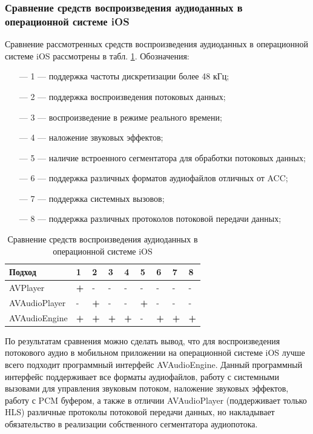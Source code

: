 	\subsubsection{Сравнение средств воспроизведения аудиоданных в операционной системе iOS}
		\par Сравнение рассмотренных средств воспроизведения аудиоданных в операционной системе iOS рассмотрены в табл. \ref{tab:ios}. 
		Обозначения:
		\begin{itemize}
			\item[---] 1 --- поддержка частоты дискретизации более 48 кГц;
			\item[---] 2 --- поддержка воспроизведения потоковых данных;
			\item[---] 3 --- воспроизведение в режиме реального времени;
			\item[---] 4 --- наложение звуковых эффектов;
			\item[---] 5 --- наличие встроенного сегментатора для обработки потоковых данных;
			\item[---] 6 --- поддержка различных форматов аудиофайлов отличных от ACC;
			\item[---] 7 --- поддержка системных вызовов;  
			\item[---] 8 --- поддержка различных протоколов потоковой передачи данных;  
		\end{itemize}

		\begin{table}[hbtp]
			\caption{Сравнение средств воспроизведения аудиоданных в операционной системе iOS}
			\centering
			\label{tab:ios}
			\begin{tabular}{|p{150pt}|l|l|l|l|l|l|l|l|}
				\hline
				\textbf{Подход} & \textbf{1} & \textbf{2} & \textbf{3} & \textbf{4} & \textbf{5} & \textbf{6} & \textbf{7} & \textbf{8}  \\ \hline
				AVPlayer        & \textbf{+} & -          & -          & -          & -          & -          & -          & -           \\ \hline
				AVAudioPlayer   & -          & \textbf{+} & -          & -          & \textbf{+} & -          & -          & -           \\ \hline
				AVAudioEngine   & \textbf{+} & \textbf{+} & \textbf{+} & \textbf{+} & -          & \textbf{+} & \textbf{+} & \textbf{+}  \\ \hline
			\end{tabular}
		\end{table}

		\par По результатам сравнения можно сделать вывод,
		что для воспроизведения потокового аудио в мобильном приложении на операционной системе iOS 
		лучше всего подходит программный интерфейс AVAudioEngine. Данный программный интерфейс поддерживает все форматы аудиофайлов, 
		работу с системными вызовами для управления звуковым потоком, наложение звуковых эффектов, работу с PCM буфером,
		а также в отличии AVAudioPlayer (поддерживает только HLS) различные протоколы потоковой передачи данных, 
		но накладывает обязательство в реализации собственного сегментатора аудиопотока.

